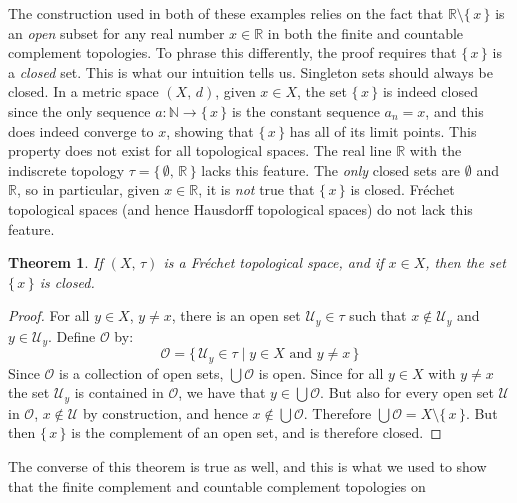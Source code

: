 \documentclass{article}
\theoremstyle{plain}
\newtheorem{theorem}{Theorem}[section]
\theoremstyle{normal}
\begin{document}
    The construction used in both of these examples relies on the fact that
    $\mathbb{R}\setminus\{\,x\,\}$ is an \textit{open} subset for any real
    number $x\in\mathbb{R}$ in both the finite and countable complement
    topologies. To phrase this differently, the proof requires that
    $\{\,x\,\}$ is a \textit{closed} set. This is what our intuition tells us.
    Singleton sets should always be closed. In a metric space $(X,\,d)$, given
    $x\in{X}$, the set $\{\,x\,\}$ is indeed closed since the only sequence
    $a:\mathbb{N}\rightarrow\{\,x\,\}$ is the constant sequence
    $a_{n}=x$, and this does indeed converge to $x$, showing that
    $\{\,x\,\}$ has all of its limit points. This property does not exist for
    all topological spaces. The real line $\mathbb{R}$ with the indiscrete
    topology $\tau=\{\,\emptyset,\,\mathbb{R}\,\}$ lacks this feature. The
    \textit{only} closed sets are $\emptyset$ and $\mathbb{R}$, so in
    particular, given $x\in\mathbb{R}$, it is \textit{not} true that
    $\{\,x\,\}$ is closed. Fr\'{e}chet topological spaces (and hence Hausdorff
    topological spaces) do not lack this feature.
    \begin{theorem}
        If $(X,\,\tau)$ is a Fr\'{e}chet topological space, and if $x\in{X}$,
        then the set $\{\,x\,\}$ is closed.
    \end{theorem}
    \begin{proof}
        For all $y\in{X}$, $y\ne{x}$, there is an open set
        $\mathcal{U}_{y}\in\tau$ such that $x\notin\mathcal{U}_{y}$ and
        $y\in\mathcal{U}_{y}$. Define $\mathcal{O}$ by:
        \begin{equation}
            \mathcal{O}=\{\,\mathcal{U}_{y}\in\tau\;|\;
                y\in{X}\textrm{ and }y\ne{x}\,\}
        \end{equation}
        Since $\mathcal{O}$ is a collection of open sets,
        $\bigcup\mathcal{O}$ is open. Since for all $y\in{X}$ with
        $y\ne{x}$ the set $\mathcal{U}_{y}$ is contained in $\mathcal{O}$,
        we have that $y\in\bigcup\mathcal{O}$. But also for every open set
        $\mathcal{U}$ in $\mathcal{O}$, $x\notin\mathcal{U}$ by construction,
        and hence $x\notin\bigcup\mathcal{O}$. Therefore
        $\bigcup\mathcal{O}=X\setminus\{\,x\,\}$. But then
        $\{\,x\,\}$ is the complement of an open set, and is therefore closed.
    \end{proof}
    The converse of this theorem is true as well, and this is what we used to
    show that the finite complement and countable complement topologies on
\end{document}
